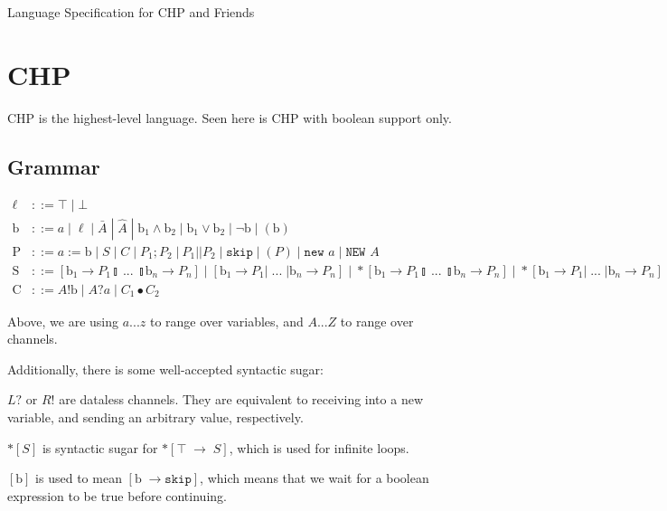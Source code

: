 \documentclass[times,10pt]{article}
\begin{document}
\begin{center}
\Large Language Specification for CHP and Friends
\end{center}

\section{CHP}

CHP is the highest-level language.  Seen here is CHP with boolean support only.

\subsection{Grammar}

\begin{align*}
\ell & ::= \top \; | \perp \\
\mathrm{b} & ::= a \; | \; \ell \; | \; \bar{A} \; | \; \widehat{A} \; | \; \mathrm{b}_1 \wedge \mathrm{b}_2 \; | \; \mathrm{b}_1 \vee \mathrm{b}_2 \; | \; \lnot \mathrm{b} \; | \; (\mathrm{b}) \\
\mathrm{P} & ::= a := \mathrm{b} \; | \; S \; | \; C \; | \; P_1; P_2 \; | \: P_1 || P_2 \; | \; \mathtt{skip} \; | \; (P) \; | \; \texttt{new } a \; | \; \texttt{NEW } A\\
\mathrm{S} & ::= [ \mathrm{b}_1 \rightarrow P_1  \talloblong \; ... \; \talloblong \mathrm{b}_n \rightarrow P_n ] \; | \; [ \mathrm{b}_1 \rightarrow P_1 | \; ... \; | \mathrm{b}_n \rightarrow P_n ] \; | \; *[ \mathrm{b}_1 \rightarrow P_1  \talloblong \; ... \; \talloblong \mathrm{b}_n \rightarrow P_n ] \; | \; *[ \mathrm{b}_1 \rightarrow P_1 | \; ... \; | \mathrm{b}_n \rightarrow P_n ] \\
\mathrm{C} & ::= A!\mathrm{b} \; | \; A?a \; | \; C_1 \bullet C_2
\end{align*}

Above, we are using $a ... z$ to range over variables, and $A ... Z$ to range over channels.

Additionally, there is some well-accepted syntactic sugar:

$L?$ or $R!$ are dataless channels.  They are equivalent to receiving into a new variable, and sending an arbitrary value, respectively.

$*[S]$ is syntactic sugar for $*[ \top \; \rightarrow \; S]$, which is used for infinite loops. 

$[\textrm{b}]$ is used to mean $[\textrm{b} \; \rightarrow \mathtt{skip}]$, which means that we wait for a boolean expression to be true before continuing.
\end{document}
